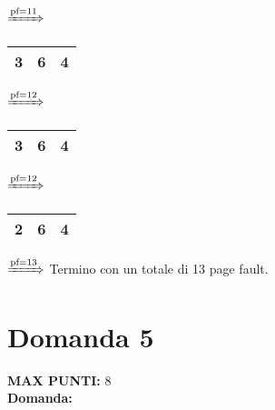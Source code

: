 \documentclass{article}
\begin{document}
\begin{itemize}
        $\xRightarrow{\text{pf}=11}$
        \begin{tabular}{|c|c|c|}
            \hline
            3 & 6 & 4\\
            \hline
        \end{tabular}
        $\xRightarrow{\text{pf}=12}$
        \begin{tabular}{|c|c|c|}
            \hline
            3 & 6 & 4\\
            \hline
        \end{tabular}
        $\xRightarrow{\text{pf}=12}$
        \begin{tabular}{|c|c|c|}
            \hline
            2 & 6 & 4\\
            \hline
        \end{tabular}
        $\xRightarrow{\text{pf}=13}$
        Termino con un totale di 13 page fault.
    \end{itemize}
    \section*{Domanda 5}
    \textbf{MAX PUNTI:} 8\\
    \textbf{Domanda:}
\end{document}
